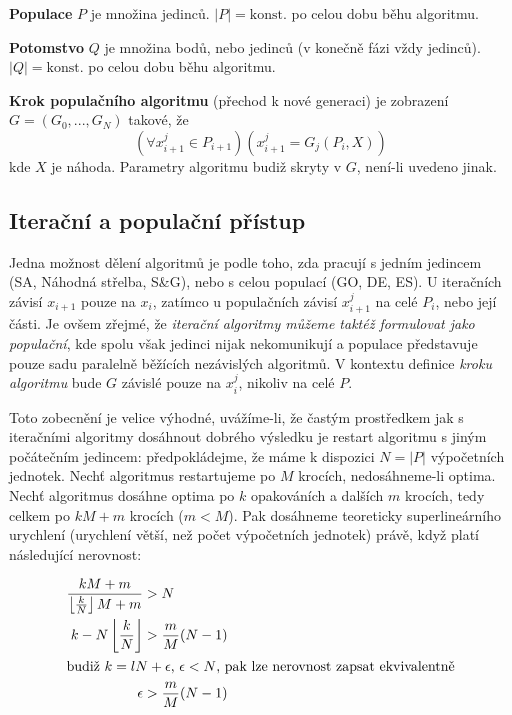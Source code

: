 \par{\textbf{Populace} $P$ je množina jedinců. $|P| =\text{konst.}$ po celou dobu běhu algoritmu.}

\par{\textbf{Potomstvo} $Q$ je množina bodů, nebo jedinců (v konečně fázi vždy jedinců). $|Q| =\text{konst.}$ po celou dobu běhu algoritmu.}

\par{\textbf{Krok populačního algoritmu} (přechod k nové generaci) je zobrazení $G = (G_0,...,G_N)$ takové, že
$$(\forall x^j_{i+1} \in P_{i+1})( x^j_{i+1} = G_j(P_i,X))$$} kde $X$ je náhoda. Parametry algoritmu budiž skryty v $G$, není-li uvedeno jinak.

\subsection{Iterační a populační přístup}

Jedna možnost dělení algoritmů je podle toho, zda pracují s jedním jedincem (SA, Náhodná střelba, S\&G), nebo s celou populací (GO, DE, ES). U iteračních závisí $x_{i+1}$ pouze na $x_i$, zatímco u populačních závisí $x^j_{i+1}$ na celé $P_i$, nebo její části. Je ovšem zřejmé, že \emph{iterační algoritmy můžeme taktéž formulovat jako populační}, kde spolu však jedinci nijak nekomunikují a populace představuje pouze sadu paralelně běžících nezávislých algoritmů. V kontextu definice \emph{kroku algoritmu} bude $G$ závislé pouze na $x^j_{i}$, nikoliv na celé $P$.

Toto zobecnění je velice výhodné, uvážíme-li, že častým prostředkem jak s iteračními algoritmy dosáhnout dobrého výsledku je restart algoritmu s jiným počátečním jedincem: předpokládejme, že máme k dispozici $N =|P|$ výpočetních jednotek. Nechť algoritmus restartujeme po $M$ krocích, nedosáhneme-li optima. Nechť algoritmus dosáhne optima po $k$ opakováních a dalších $m$ krocích, tedy celkem po $kM + m$ krocích ($m<M$). Pak dosáhneme teoreticky superlineárního urychlení (urychlení větší, než počet výpočetních jednotek) právě, když platí následující nerovnost:

\begin{align}
  \frac{kM+m}{\left\lfloor\frac{k}{N}\right\rfloor M+m} & > N \\
  k - N\left\lfloor\frac{k}{N}\right\rfloor & >\frac{m}{M}(N-1)\\
  \intertext{budiž $k=lN+\epsilon$, $\epsilon < N$, pak lze nerovnost zapsat ekvivalentně}
  \epsilon & >\frac{m}{M}(N-1)
\end{align}

